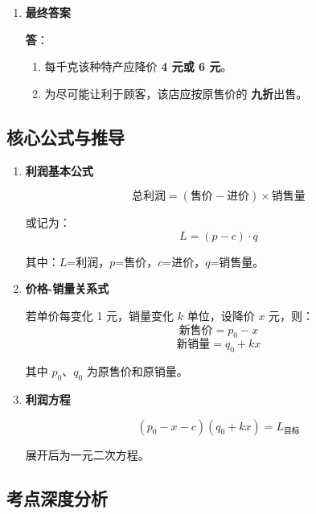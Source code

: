 \documentclass[UTF8]{ctexart}
\newenvironment{redenv}{\color{red}}{}
\newenvironment{detailedanalysis}{%
    \color{red}
    \begin{enumerate}[label=\textbf{第\arabic*步：}, leftmargin=*, align=left, itemsep=1.5ex]
}{%
    \end{enumerate}
}
\newenvironment{formuladerivation}{%
    \begin{enumerate}[label={\textbf{公式\arabic*：}}, leftmargin=*, align=left]
}{%
    \end{enumerate}
}
\begin{document}
\begin{redenv}
\begin{detailedanalysis}
\noindent\textbf{验证 $x = 6$}：
\begin{itemize}
    \item 售价：$60 - 6 = 54$ 元/kg
    \item 每千克利润：$54 - 40 = 14$ 元
    \item 销量：$100 + 10 \times 6 = 160$ kg
    \item 总利润：$14 \times 160 = 2240$ 元 \checkmark
\end{itemize}

\noindent\textbf{验证折扣}：
\[
\frac{54}{60} \times 10 = 9 \text{（折）}
\]

\item \textbf{最终答案}

\textbf{答}：
\begin{enumerate}[label=(\arabic*)]
    \item 每千克该种特产应降价 \textbf{4 元或 6 元}。
    \item 为尽可能让利于顾客，该店应按原售价的 \textbf{九折}出售。
\end{enumerate}
\end{detailedanalysis}

\subsection*{核心公式与推导}

\begin{formuladerivation}
\item \textbf{利润基本公式}

\[
\text{总利润} = (\text{售价} - \text{进价}) \times \text{销售量}
\]

或记为：
\[
L = (p - c) \cdot q
\]

其中：$L$=利润，$p$=售价，$c$=进价，$q$=销售量。

\item \textbf{价格-销量关系式}

若单价每变化 1 元，销量变化 $k$ 单位，设降价 $x$ 元，则：
\[
\text{新售价} = p_0 - x
\]
\[
\text{新销量} = q_0 + kx
\]

其中 $p_0$、$q_0$ 为原售价和原销量。

\item \textbf{利润方程}

\[
(p_0 - x - c)(q_0 + kx) = L_{\text{目标}}
\]

展开后为一元二次方程。
\end{formuladerivation}

\subsection*{考点深度分析}


\end{redenv}
\end{document}
